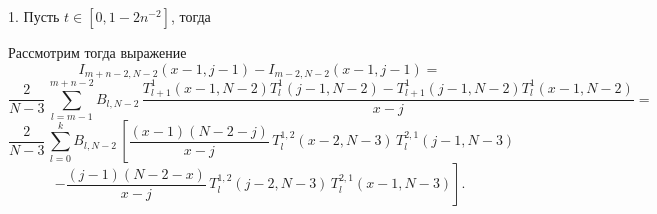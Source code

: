 \documentclass[12pt]{book}
\begin{document}
1. Пусть $t \in [0, 1-2n^{-2}]$, тогда


\newpage
\newpage

Рассмотрим тогда выражение
\begin{equation*}
  I_{m+n-2,N-2}(x-1,j-1) - I_{m-2,N-2}(x-1,j-1) =
\end{equation*}
\begin{equation*}
  \frac{2}{N-3}\,
  \sum_{l=m-1}^{m+n-2} B_{l,N-2}\,
  \frac{T_{l+1}^1(x-1,N-2) T_{l}^1(j-1,N-2) - T_{l+1}^1(j-1,N-2) T_{l}^1(x-1,N-2)}{x-j} =
\end{equation*}
\begin{equation*}
  \frac{2}{N-3}\,\sum_{l=0}^{k} B_{l,N-2}\, \left[
    \frac{(x-1)(N-2-j)}{x-j}\,T^{1,2}_{l}(x-2,N-3)\,T^{2,1}_{l}(j-1,N-3)
  \right.
\end{equation*}
\begin{equation*}
\left.
  - \frac{(j-1)(N-2-x)}{x-j}\,T^{1,2}_{l}(j-2,N-3)\,T^{2,1}_{l}(x-1,N-3)
\right].
\end{equation*}
\end{document}
